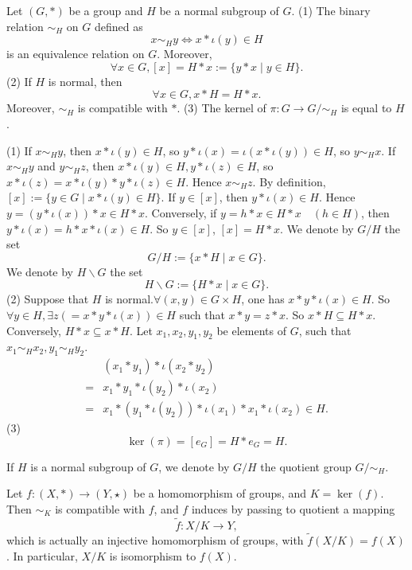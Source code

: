 \documentclass{book}
\numberwithin{equation}{section}
\begin{document}
\begin{propositionenv}
    Let $(G, *)$ be a group and $H$ be a normal subgroup of $G$.
    \newline
    (1) The binary relation $\sim_H$ on $G$ defined as 
    $$x\sim_H y\Leftrightarrow x*\iota(y)\in H$$
    is an equivalence relation on $G$. Moreover,  
    $$\forall x\in G,  [x]=H*x:=\{y*x\mid y\in H\}.$$
    (2) If $H$ is normal,  then
    $$\forall x\in G, x*H=H*x.$$
    Moreover,  $\sim_H$ is compatible with $*$.
    \newline
    (3) The kernel of $\pi :G\rightarrow G/\sim_H$ is equal to $H$.
\end{propositionenv}
\begin{proofenv}
    \quad\newline
    (1) If $x\sim_H y$,  then $x*\iota(y)\in H$,  so $y*\iota(x)=\iota(x*\iota(y))\in H$,  so $y\sim_H x$. If $x\sim_H y$ and $y\sim_H z$,  then $x*\iota(y)\in H,  y*\iota(z)\in H$,  so $x*\iota(z)=x*\iota(y)*y*\iota(z)\in H$. Hence $x\sim_H z$. By definition,  $[x]:=\{y\in G\mid  x*\iota(y)\in H\}$. If $y\in [x]$,  then $y*\iota(x)\in H$. Hence $y=(y*\iota(x))*x\in H*x$. Conversely,  if $y=h*x\in H*x \quad (h\in H)$,  then $y*\iota(x)=h*x*\iota(x)\in H$. So $y\in [x]$,  $[x]=H*x$.
    \newline
    We denote by $G/H $ the set 
    $$G/H:=\{x*H\mid x\in G\}.$$ 
    We denote by $H\backslash G$ the set 
    $$H\backslash G:=\{H*x\mid x\in G\}.$$
    (2) Suppose that $H$ is normal.$\forall (x, y)\in G\times H$,  one has $x*y*\iota(x)\in H$. So $\forall y\in H, \exists z(=x*y*\iota(x))\in H$ such that $x*y=z*x$. So $x*H\subseteq H*x$. Conversely,  $H*x\subseteq x*H$. Let $x_1, x_2, y_1, y_2$ be elements of $G$,  such that $x_1\sim_H x_2, y_1\sim_H y_2$.
    \begin{align*}
&(x_1*y_1)*\iota (x_2*y_2)\\
=&x_1*y_1*\iota (y_2)*\iota (x_2)\\
=&x_1*(y_1*\iota (y_2))*\iota (x_1)*x_1*\iota (x_2)\in H.
\end{align*}
    (3)$$\ker(\pi)=[e_G]=H*e_G=H.$$
\end{proofenv}
\begin{notationenv}
    If $H$ is a normal subgroup of $G$,  we denote by $G/H$ the quotient group $G/\sim_H$.
\end{notationenv}
\begin{theoremenv}
    Let $f:(X, *)\rightarrow (Y, \star)$ be a homomorphism of groups,  and $K=\ker(f)$. Then $\sim_K$ is compatible with $f$,  and $f$ induces by passing to quotient a mapping
    $$\tilde{f}:X/K\longrightarrow Y, $$
    which is actually an injective homomorphism of groups,  with $\tilde{f}(X/K)=f(X)$. In particular,  $X/K$ is isomorphism to $f(X)$.
        \begin{center}
\end{center}
\end{theoremenv}
\end{document}
